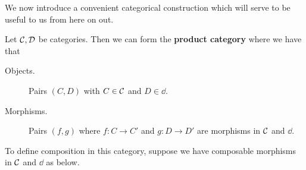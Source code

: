     We now introduce a convenient categorical construction which will serve to be useful to us 
    from here on out. 

    \begin{definition}
        Let $\mathcal{C}, \mathcal{D}$ be categories. Then we can form the \textbf{product category} where 
        we have that 
        \begin{description}
            \item[Objects.] Pairs $(C, D)$ with $C \in \mathcal{C}$ and $D \in \dd$.
            \item[Morphisms.] Pairs $(f, g)$ where $f: C \to C'$ and $g: D \to D'$ are morphisms in $\mathcal{C}$ and $\dd$.    
        \end{description}
        To define composition in this category, suppose we have composable morphisms in $\mathcal{C}$ 
        and $\dd$ as below. 
        \begin{center}
\end{center}
\end{definition}
